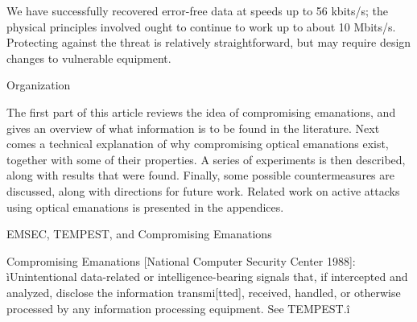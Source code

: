 We have successfully recovered error-free data at speeds up to 56 kbits/s; the physical principles involved ought to continue to work up to about 10 Mbits/s. Protecting against the threat is relatively straightforward, but may require design changes to vulnerable equipment.

Organization

The first part of this article reviews the idea of compromising emanations, and gives an overview of what information is to be found in the literature. Next comes a technical explanation of why compromising optical emanations exist, together with some of their properties. A series of experiments is then described, along with results that were found. Finally, some possible countermeasures are discussed, along with directions for future work. Related work on active attacks using optical emanations is presented in the appendices.

EMSEC, TEMPEST, and Compromising Emanations

Compromising Emanations [National Computer Security Center 
1988]: ìUnintentional data-related or intelligence-bearing signals 
that, if intercepted and analyzed, disclose the information 
transmi[tted], received, handled, or otherwise processed by any information 
processing equipment. See TEMPEST.î 

